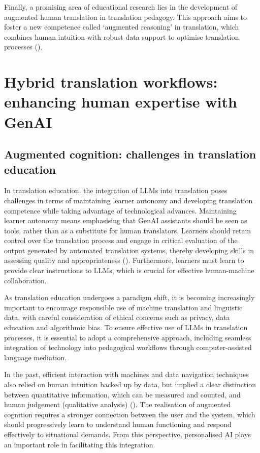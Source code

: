 \documentclass[output=paper]{langscibook}
\begin{document}
Finally, a promising area of educational research lies in the development of augmented human translation in translation pedagogy. This approach aims to foster a new competence called ‘augmented reasoning’ in translation, which combines human intuition with robust data support to optimise translation processes (\cite{emt_european_2022}).

\section{Hybrid translation workflows: enhancing human expertise with GenAI}\label{sec:8:4}

\subsection{Augmented cognition: challenges in translation education}
In translation education, the integration of LLMs into translation poses challenges in terms of maintaining learner autonomy and developing translation competence while taking advantage of technological advances. Maintaining learner autonomy means emphasising that GenAI assistants should be seen as tools, rather than as a substitute for human translators. Learners should retain control over the translation process and engage in critical evaluation of the output generated by automated translation systems, thereby developing skills in assessing quality and appropriateness (\citealt{gledhillzimina23}). Furthermore, learners must learn to provide clear instructions to LLMs, which is crucial for effective human-machine collaboration.

As translation education undergoes a paradigm shift, it is becoming increasingly important to encourage responsible use of machine translation and linguistic data, with careful consideration of ethical concerns such as privacy, data education and algorithmic bias. To ensure effective use of LLMs in translation processes, it is essential to adopt a comprehensive approach, including seamless integration of technology into pedagogical workflows through computer-assisted language mediation.

In the past, efficient interaction with machines and data navigation techniques also relied on human intuition backed up by data, but implied a clear distinction between quantitative information, which can be measured and counted, and human judgement (qualitative analysis) (\citealt{ziminafleury16}). The realisation of augmented cognition requires a stronger connection between the user and the system, which should progressively learn to understand human functioning and respond effectively to situational demands. From this perspective, personalised AI plays an important role in facilitating this integration.
\end{document}
